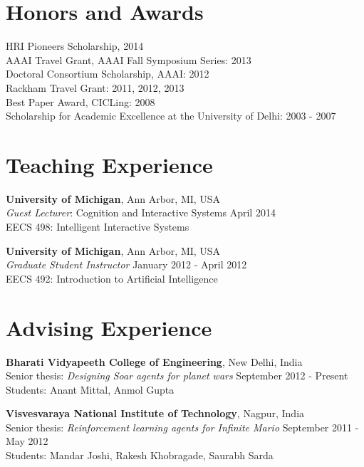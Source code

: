 \documentclass[margin,line,11pt]{res}
\begin{document}
\begin{resume}
                  \section{\sc Honors and Awards} 
                  HRI Pioneers Scholarship, 2014\\
                  AAAI Travel Grant, AAAI Fall Symposium Series: 2013\\
                  Doctoral Consortium Scholarship, AAAI: 2012 \\
                  Rackham Travel Grant: 2011, 2012, 2013 \\
                  Best Paper Award, CICLing: 2008 \\
                  Scholarship for Academic Excellence at the University of Delhi: 2003 - 2007 

                  \section{\sc Teaching Experience}
                  \textbf{University of Michigan}, Ann Arbor, MI, USA
                  \\ \emph{Guest Lecturer}: Cognition and Interactive
                  Systems \hfill April 2014 \\ EECS 498: Intelligent
                  Interactive Systems

                  \textbf{University of Michigan}, Ann Arbor, MI, USA \\
                  \emph{Graduate Student Instructor} \hfill January 2012 - April 2012 \\
                  EECS 492: Introduction to Artificial Intelligence

                  \section{\sc Advising Experience}
                  \textbf{Bharati Vidyapeeth College of Engineering}, New Delhi, India\\
                  Senior thesis: \emph{Designing Soar agents for planet wars} \hfill September 2012 - Present\\
                  Students: Anant Mittal, Anmol Gupta

                  \textbf{Visvesvaraya National Institute of
                    Technology}, Nagpur, India\\ Senior thesis:
                  \emph{Reinforcement learning agents for Infinite
                    Mario} \hfill September 2011 - May
                  2012\\ Students: Mandar Joshi, Rakesh Khobragade,
                  Saurabh Sarda\\





\end{resume}
\end{document}
